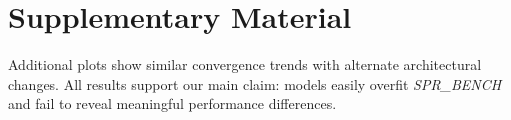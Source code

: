 \documentclass{article}
\begin{document}



\clearpage
\appendix

\section{Supplementary Material}
Additional plots show similar convergence trends with alternate architectural changes. All results support our main claim: models easily overfit \textit{SPR\_BENCH} and fail to reveal meaningful performance differences.
\end{document}
